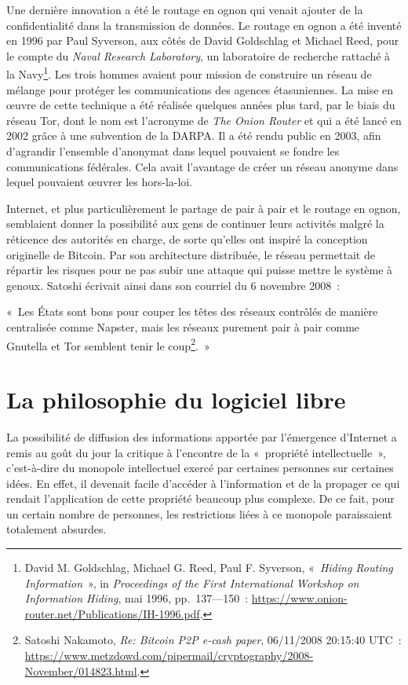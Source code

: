 \documentclass[
  a5paper,
  smalldemyvopaper,10pt,twoside,onecolumn,openright,extrafontsizes,hidelinks]{memoir}
\begin{document}
Une dernière innovation a été le routage en ognon qui venait ajouter de
la confidentialité dans la transmission de données. Le routage en ognon
a été inventé en 1996 par Paul Syverson, aux côtés de David Goldschlag
et Michael Reed, pour le compte du \emph{Naval Research Laboratory}, un
laboratoire de recherche rattaché à la Navy\footnote{David M.
  Goldschlag, Michael G. Reed, Paul F. Syverson, «~\emph{Hiding Routing
  Information}~», in \emph{Proceedings of the First International
  Workshop on Information Hiding}, mai 1996, pp.~137---150~:
  \url{https://www.onion-router.net/Publications/IH-1996.pdf}.}. Les
trois hommes avaient pour mission de construire un réseau de mélange
pour protéger les communications des agences étasuniennes. La mise en
œuvre de cette technique a été réalisée quelques années plus tard, par
le biais du réseau Tor, dont le nom est l'acronyme de \emph{The Onion
Router} et qui a été lancé en 2002 grâce à une subvention de la DARPA.
Il a été rendu public en 2003, afin d'agrandir l'ensemble d'anonymat
dans lequel pouvaient se fondre les communications fédérales. Cela avait
l'avantage de créer un réseau anonyme dans lequel pouvaient œuvrer les
hors-la-loi.

Internet, et plus particulièrement le partage de pair à pair et le
routage en ognon, semblaient donner la possibilité aux gens de continuer
leurs activités malgré la réticence des autorités en charge, de sorte
qu'elles ont inspiré la conception originelle de Bitcoin. Par son
architecture distribuée, le réseau permettait de répartir les risques
pour ne pas subir une attaque qui puisse mettre le système à genoux.
Satoshi écrivait ainsi dans son courriel du 6 novembre 2008~:

«~Les États sont bons pour couper les têtes des réseaux contrôlés de
manière centralisée comme Napster, mais les réseaux purement pair à pair
comme Gnutella et Tor semblent tenir le coup\footnote{Satoshi Nakamoto,
  \emph{Re: Bitcoin P2P e-cash paper}, 06/11/2008 20:15:40 UTC~:
  \url{https://www.metzdowd.com/pipermail/cryptography/2008-November/014823.html}.}.~»

\section*{La philosophie du logiciel
libre}\label{la-philosophie-du-logiciel-libre}


La possibilité de diffusion des informations apportée par l'émergence
d'Internet a remis au goût du jour la critique à l'encontre de la
«~propriété intellectuelle~», c'est-à-dire du monopole intellectuel
exercé par certaines personnes sur certaines idées. En effet, il
devenait facile d'accéder à l'information et de la propager ce qui
rendait l'application de cette propriété beaucoup plus complexe. De ce
fait, pour un certain nombre de personnes, les restrictions liées à ce
monopole paraissaient totalement absurdes.
\end{document}
